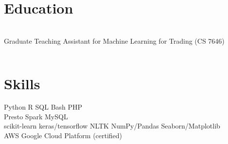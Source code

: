\documentclass[]{deedy-resume-reversed}
\begin{document}
\begin{minipage}[t]{0.27\textwidth}


\section{Education}

\\
\vskip 0.05in
\footnotesize{Graduate Teaching Assistant for Machine Learning for Trading (CS 7646)}
\\ %
\sectionsep
\sectionsep
{}
\\
\sectionsep


\section{Skills}
Python \textbullet{} R \textbullet{} SQL \textbullet{} Bash \textbullet{} PHP \\
\vskip 0.1in
Presto \textbullet{} Spark \textbullet{} MySQL \\
\vskip 0.1in
scikit-learn \textbullet{} keras/tensorflow \textbullet{} NLTK \textbullet{} NumPy/Pandas \textbullet{} Seaborn/Matplotlib \\
\vskip 0.1in
AWS \textbullet{} Google Cloud Platform (certified)

\sectionsep


%


\end{minipage}
\end{document}
